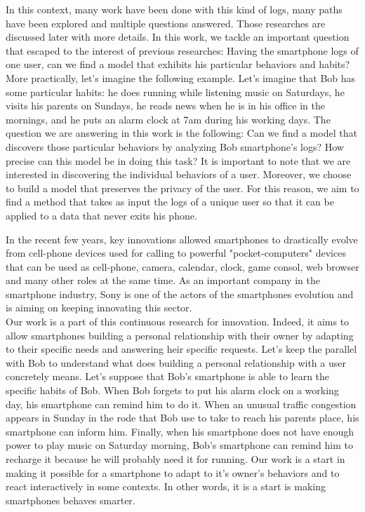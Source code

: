 In this context, many work have been done with this kind of logs, many paths have been explored and multiple questions answered. Those researches are discussed later with more details.
In this work, we tackle an important question that escaped to the interest of previous researches: Having the smartphone logs of one user, can we find a model that exhibits his particular behaviors and habits? More practically, let's imagine the following example. Let's imagine that Bob has some particular habits: he does running while listening music on Saturdays, he visits his parents on Sundays, he reads news when he is in his office in the mornings, and he puts an alarm clock at 7am during his working days. The question we are answering in this work is the following: Can we find a model that discovers those particular behaviors by analyzing Bob smartphone's logs? How precise can this model be in doing this task?
It is important to note that we are interested in discovering the individual behaviors of a user. Moreover, we choose to build a model that preserves the privacy of the user. For this reason, we aim to find a method that takes as input the logs of a unique user so that it can be applied to a data that never exits his phone. \par

In the recent few years, key innovations allowed smartphones to drastically evolve from cell-phone devices used for calling to powerful "pocket-computers" devices that can be used as cell-phone, camera, calendar, clock, game consol, web browser and many other roles at the same time. As an important company in the smartphone industry, Sony is one of the actors of the smartphones evolution and is aiming on keeping innovating this sector. 
\\Our work is a part of this continuous research for innovation. Indeed, it aims to allow smartphones building a personal relationship with their owner by adapting to their specific needs and answering heir specific requests. Let's keep the parallel with Bob to understand what does building a personal relationship with a user concretely means. Let's suppose that Bob's smartphone is able to learn the specific habits of Bob. When Bob forgets to put his alarm clock on a working day, his smartphone can remind him to do it. When an unusual traffic congestion appears in Sunday in the rode that Bob use to take to reach his parents place, his smartphone can inform him. Finally, when his smartphone does not have enough power to play music on Saturday morning, Bob's smartphone can remind him to recharge it because he will probably need it for running. Our work is a start in making it possible for a smartphone to adapt to it's owner's behaviors and to react interactively in some contexts. In other words, it is a start is making smartphones behaves smarter. \par


